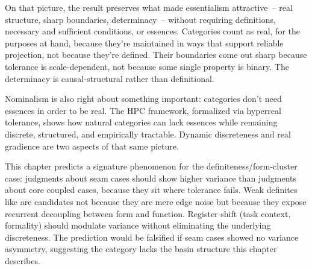 On that picture, the result preserves what made essentialism attractive~-- real structure, sharp boundaries, determinacy~-- without requiring definitions, necessary and sufficient conditions, or essences. Categories count as real, for the purposes at hand, because they're maintained in ways that support reliable projection, not because they're defined. Their boundaries come out sharp because tolerance is scale-dependent, not because some single property is binary. The determinacy is causal-structural rather than definitional.

Nominalism is also right about something important: categories don't need essences in order to be real. The HPC framework, formalized via hyperreal tolerance, shows how natural categories can lack essences while remaining discrete, structured, and empirically tractable. Dynamic discreteness and real gradience are two aspects of that same picture.

\begin{definitenessthread}
This chapter predicts a signature phenomenon for the definiteness/form-cluster case: judgments about seam cases should show higher variance than judgments about core coupled cases, because they sit where tolerance fails. Weak definites like  are candidates not because they are mere edge noise but because they expose recurrent decoupling between form and function. Register shift (task context, formality) should modulate variance without eliminating the underlying discreteness. The prediction would be falsified if seam cases showed no variance asymmetry, suggesting the category lacks the basin structure this chapter describes.
\end{definitenessthread}
